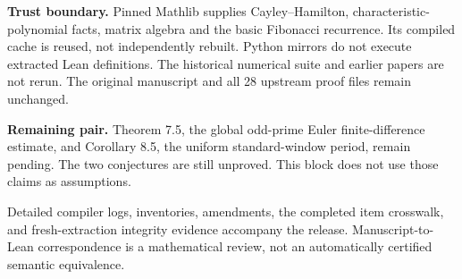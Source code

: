 \documentclass[11pt]{article}
\begin{document}
\textbf{Trust boundary.} Pinned Mathlib supplies Cayley--Hamilton, characteristic-polynomial facts, matrix algebra and the basic Fibonacci recurrence. Its compiled cache is reused, not independently rebuilt. Python mirrors do not execute extracted Lean definitions. The historical numerical suite and earlier papers are not rerun. The original manuscript and all 28 upstream proof files remain unchanged.

\textbf{Remaining pair.} Theorem 7.5, the global odd-prime Euler finite-difference estimate, and Corollary 8.5, the uniform standard-window period, remain pending. The two conjectures are still unproved. This block does not use those claims as assumptions.

Detailed compiler logs, inventories, amendments, the completed item crosswalk, and fresh-extraction integrity evidence accompany the release. Manuscript-to-Lean correspondence is a mathematical review, not an automatically certified semantic equivalence.
\end{document}
